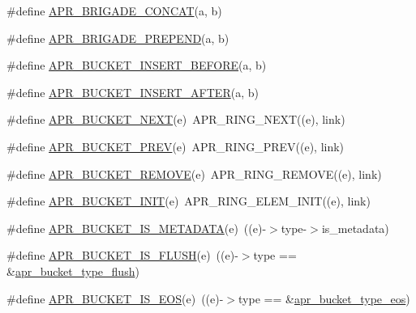 \begin{DoxyCompactItemize}
\#define \hyperlink{group___a_p_r___util___bucket___brigades_ga7cecbc89be912ce9ab24c889eb8f955b}{A\-P\-R\-\_\-\-B\-R\-I\-G\-A\-D\-E\-\_\-\-C\-O\-N\-C\-A\-T}(a, b)
\item 
\#define \hyperlink{group___a_p_r___util___bucket___brigades_ga52ba212f76507a79ccae213875150ad1}{A\-P\-R\-\_\-\-B\-R\-I\-G\-A\-D\-E\-\_\-\-P\-R\-E\-P\-E\-N\-D}(a, b)
\item 
\#define \hyperlink{group___a_p_r___util___bucket___brigades_gae012adeccda754eabc42b7855bec081e}{A\-P\-R\-\_\-\-B\-U\-C\-K\-E\-T\-\_\-\-I\-N\-S\-E\-R\-T\-\_\-\-B\-E\-F\-O\-R\-E}(a, b)
\item 
\#define \hyperlink{group___a_p_r___util___bucket___brigades_ga1f8114b7316d1fef1deb95abc8f02341}{A\-P\-R\-\_\-\-B\-U\-C\-K\-E\-T\-\_\-\-I\-N\-S\-E\-R\-T\-\_\-\-A\-F\-T\-E\-R}(a, b)
\item 
\#define \hyperlink{group___a_p_r___util___bucket___brigades_ga7171f690b203d548a5b6ae0b079068d8}{A\-P\-R\-\_\-\-B\-U\-C\-K\-E\-T\-\_\-\-N\-E\-X\-T}(e)~A\-P\-R\-\_\-\-R\-I\-N\-G\-\_\-\-N\-E\-X\-T((e), link)
\item 
\#define \hyperlink{group___a_p_r___util___bucket___brigades_gaf229fecd4174efd4d6a9774e3048ae28}{A\-P\-R\-\_\-\-B\-U\-C\-K\-E\-T\-\_\-\-P\-R\-E\-V}(e)~A\-P\-R\-\_\-\-R\-I\-N\-G\-\_\-\-P\-R\-E\-V((e), link)
\item 
\#define \hyperlink{group___a_p_r___util___bucket___brigades_ga2c46a1b717a87b68bd98b425e0c64977}{A\-P\-R\-\_\-\-B\-U\-C\-K\-E\-T\-\_\-\-R\-E\-M\-O\-V\-E}(e)~A\-P\-R\-\_\-\-R\-I\-N\-G\-\_\-\-R\-E\-M\-O\-V\-E((e), link)
\item 
\#define \hyperlink{group___a_p_r___util___bucket___brigades_ga00c2e104125f124c3a52627863432de9}{A\-P\-R\-\_\-\-B\-U\-C\-K\-E\-T\-\_\-\-I\-N\-I\-T}(e)~A\-P\-R\-\_\-\-R\-I\-N\-G\-\_\-\-E\-L\-E\-M\-\_\-\-I\-N\-I\-T((e), link)
\item 
\#define \hyperlink{group___a_p_r___util___bucket___brigades_ga506cb29cc1ec1abeb487e01b122bd4d9}{A\-P\-R\-\_\-\-B\-U\-C\-K\-E\-T\-\_\-\-I\-S\-\_\-\-M\-E\-T\-A\-D\-A\-T\-A}(e)~((e)-\/$>$type-\/$>$is\-\_\-metadata)
\item 
\#define \hyperlink{group___a_p_r___util___bucket___brigades_ga24105da0bb755a775c4b2a519d7c25f9}{A\-P\-R\-\_\-\-B\-U\-C\-K\-E\-T\-\_\-\-I\-S\-\_\-\-F\-L\-U\-S\-H}(e)~((e)-\/$>$type == \&\hyperlink{group___a_p_r___util___bucket___brigades_gaecc113cfcc7751dfe70876437a2f51d7}{apr\-\_\-bucket\-\_\-type\-\_\-flush})
\item 
\#define \hyperlink{group___a_p_r___util___bucket___brigades_ga89b225e1c08473766eec719b985ca0d6}{A\-P\-R\-\_\-\-B\-U\-C\-K\-E\-T\-\_\-\-I\-S\-\_\-\-E\-O\-S}(e)~((e)-\/$>$type == \&\hyperlink{group___a_p_r___util___bucket___brigades_ga829cac9b4843b85a902ddd64dffbfb12}{apr\-\_\-bucket\-\_\-type\-\_\-eos})

\end{DoxyCompactItemize}
